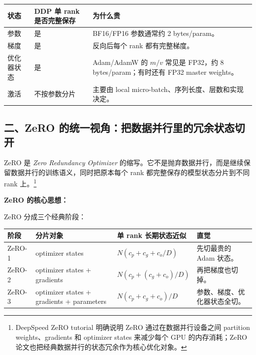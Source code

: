 \begin{center}
{\small
\begin{tabular}{p{3.2cm}p{4.5cm}p{5cm}}
\hline
\textbf{状态} & \textbf{DDP 单 rank 是否完整保存} & \textbf{为什么贵} \\
\hline
参数 & 是 & BF16/FP16 参数通常约 2 bytes/param。 \\
梯度 & 是 & 反向后每个 rank 都有完整梯度。 \\
优化器状态 & 是 & Adam/AdamW 的 $m/v$ 常见是 FP32，约 8 bytes/param；有时还有 FP32 master weights。 \\
激活 & 不按参数分片 & 主要由 local micro-batch、序列长度、层数和实现决定。 \\
\hline
\end{tabular}
}
\end{center}

\subsection{二、ZeRO 的统一视角：把数据并行里的冗余状态切开}

ZeRO 是 \emph{Zero Redundancy Optimizer} 的缩写。它不是抛弃数据并行，而是继续保留数据并行的训练语义，同时把原本每个 rank 都完整保存的模型状态分片到不同 rank 上。\footnote{DeepSpeed ZeRO tutorial 明确说明 ZeRO 通过在数据并行设备之间 partition weights、gradients 和 optimizer states 来减少每个 GPU 的内存消耗；ZeRO 论文也把经典数据并行的状态冗余作为核心优化对象。}

\begin{summarybox}
\textbf{ZeRO 的核心思想：}\
\end{summarybox}

ZeRO 分成三个经典阶段：

\begin{center}
{\small
\begin{tabular}{p{2.6cm}p{3.9cm}p{3.7cm}p{3.1cm}}
\hline
\textbf{阶段} & \textbf{分片对象} & \textbf{单 rank 长期状态近似} & \textbf{直觉} \\
\hline
ZeRO-1 & optimizer states & $N(c_p + c_g + c_o/D)$ & 先切最贵的 Adam 状态。 \\
ZeRO-2 & optimizer states + gradients & $N(c_p + (c_g+c_o)/D)$ & 再把梯度也切掉。 \\
ZeRO-3 & optimizer states + gradients + parameters & $N(c_p+c_g+c_o)/D$ & 参数、梯度、优化器状态全切。 \\
\hline
\end{tabular}
}
\end{center}

